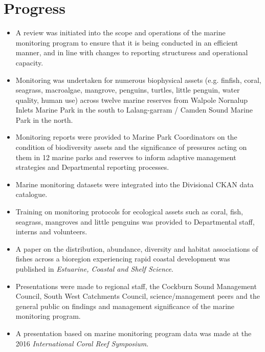 \documentclass[version=last,
    paper=a4, %
    10pt, %
    usenames,
    dvipsnames,
    oneside, %
    headings=openany, %
    DIV=15 %
]{scrbook}
\begin{document}
\section*{Progress}
\begin{itemize}
\itemsep1pt\parskip0pt
\item
  A review was initiated into the scope and operations of the marine
  monitoring program to ensure that it is being conducted in an
  efficient manner, and in line with changes to reporting structuress
  and operational capacity.
\item
  Monitoring was undertaken for numerous biophysical assets (e.g.
  finfish, coral, seagrass, macroalgae, mangrove, penguins, turtles,
  little penguin, water quality, human use) across twelve marine
  reserves from Walpole Nornalup Inlets Marine Park in the south to
  Lalang-garram / Camden Sound Marine Park in the north.
\item
  Monitoring reports were provided to Marine Park Coordinators on the
  condition of biodiversity assets and the significance of pressures
  acting on them in 12 marine parks and reserves to inform adaptive
  management strategies and Departmental reporting processes.
\item
  Marine monitoring datasets were integrated into the Divisional CKAN
  data catalogue.
\item
  Training on monitoring protocols for ecological assets such as coral,
  fish, seagrass, mangroves and little penguins was provided to
  Departmental staff, interns and volunteers.
\item
  A paper on the distribution, abundance, diversity and habitat
  associations of fishes across a bioregion experiencing rapid coastal
  development was published in \emph{Estuarine, Coastal and Shelf
  Science}.
\item
  Presentations were made to regional staff, the Cockburn Sound
  Management Council, South West Catchments Council, science/management
  peers and the general public on findings and management significance
  of the marine monitoring program.
\item
  A presentation based on marine monitoring program data was made at the
  2016 \emph{International Coral Reef Symposium}.
\end{itemize}
\end{document}
